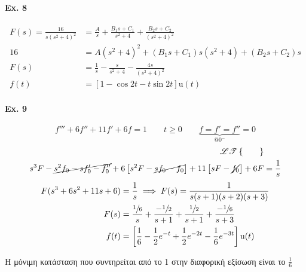     \paragraph{Ex. 8}
    \begin{align*}
    F(s) = \frac{16}{s(s^2+4)^2} &=
    \frac{A}{s} + \frac{B_1s + C_1}{s^2+4} + \frac{B_2s+C_2}{(s^2+4)^2} \\
    16 &= A(s^2+4)^2 + (B_1s+C_1)s(s^2+4) + (B_2s+C_2)s \\
    F(s) &= \frac{1}{s} - \frac{s}{s^2+4} - \frac{4s}{(s^2+4)^2} \\
    f(t) &= \left[ 1-\cos 2t - t\sin 2t \right] \mathrm u(t)
    \end{align*}

    \paragraph{Ex. 9}
    \[
    f''' + 6f'' + 11f' + 6f = 1 \qquad t\geq 0 \qquad
    \underbrace{f=f'=f''}_{@ 0^-}=0
    \]
    \begin{align*}
    \mathscr{LT}\left\lbrace \qquad \right\rbrace & \\
    s^3F - \cancel{s^2f_0 - sf_0' -f_0''}
    +6 \left[ s^2F-\cancel{sf_0-f_0} \right]
     + 11 \left[ sF - \cancel{f_0} \right] + 6F
    &= \frac{1}{s}
    \end{align*}
    \vspace{-27pt}
    \begin{align*}
    F(s^3+6s^2+11s+6)&= \frac{1}{s}
    \implies F(s) = \frac{1}{s(s+1)(s+2)(s+3)}
    \\ F(s) &= \frac{\sfrac{1}{6} }{s}
    + \frac{-\sfrac{1}{2} }{s+1}
    + \frac{\sfrac{1}{2} }{s+1}
    + \frac{-\sfrac{1}{6} }{s+3} \\
    f(t) &= \left[
    \frac{1}{6}-\frac{1}{2}e^{-t}+\frac{1}{2}e^{-2t}-\frac{1}{6}e^{-3t}
    \right]\mathrm u(t)
    \end{align*}

    Η μόνιμη κατάσταση που συντηρείται από το 1 στην διαφορική εξίσωση είναι το
    \( \frac{1}{6} \)

